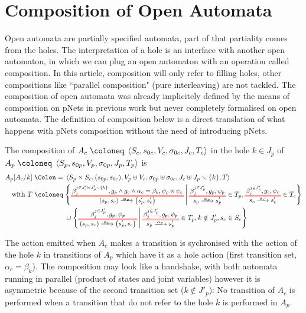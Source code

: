 \documentclass{article}
\begin{document}
\section{Composition of Open Automata}\label{sec:comp}
Open automata are partially specified automata, part of that partiality comes from the holes.
The interpretation of a hole is an interface with another open automaton, in which we can plug an open automaton with an operation called composition.
In this article, composition will only refer to filling holes, other compositions like ``parallel composition" (pure interleaving) are not tackled.
The composition of open automata was already implicitely defined by the means of composition on pNets in previous work \cite{henrio:01299562} but never completely formalised on open automata.
The definition of composition below is a direct translation of what happens with pNets composition without the need of introducing pNets.
\begin{defi}
The composition of \(A_c \defobject \OAg[c]\) in the hole \(k \in J_p\) of \(A_p \defobject \OAg[p]\) is
\begin{align*}
	A_p\subst{A_c}{k} \defnotation & \OA{S_p \times S_c}{\mpar{s_{0p}, s_{0c}}}{V_p \uplus V_c}{\sigma_{0p} \uplus \sigma_{0c}}{J_c \uplus J_p \setminus \mbrc{k}}{T} \\
	\text{with } T \defobject & \mset{\OT{\mpar{s_p, s_c}}{\mpar{s'_p, s'_c}}{\alpha_p}{\beta_j^{j \in J'_c \uplus J'_p \setminus \mbrc{k}}}{g_p \wedge g_c \wedge \alpha_c = \beta_k}{\psi_p \uplus \psi_c}}{\OTx{p}{}{}{p} \in T_p, \OTx{c}{}{}{c} \in T_c} \\
	& \cup \mset{\OT{\mpar{s_p, s_c}}{\mpar{s'_p, s_c}}{\alpha_p}{\beta_j^{j \in J'_p}}{g_p}{\psi_p}}{\OTx{p}{}{}{p} \in T_p, k \notin J'_p, s_c \in S_c}
\end{align*}
\end{defi}
The action emitted when \(A_c\) makes a transition is sychronised with the action of the hole \(k\) in transitions of \(A_p\) which have it as a hole action (first transition set, \(\alpha_c = \beta_k\)).
The composition may look like a handshake, with both automata running in parallel (product of states and joint variables) however it is asymmetric because of the second transition set (\(k \notin J'_p\)):
No transition of \(A_c\) is performed when a transition that do not refer to the hole \(k\) is performed in \(A_p\).
\end{document}
